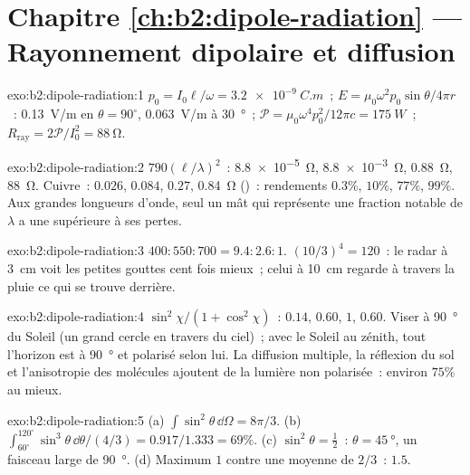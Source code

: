 \section*{Chapitre \ref{ch:b2:dipole-radiation} --- Rayonnement dipolaire et diffusion}

\begin{solution}{exo:b2:dipole-radiation:1}
$p_0 = I_0\ell/\omega = \qty{3.2e-9}{C.m}$~; $E = \mu_0\omega^2p_0\sin\theta/4\pi r$~: \qty{0.13}{V/m}
en $\theta = 90^\circ$, \qty{0.063}{V/m} à \qty{30}{\degree}~; $\mathcal P = \mu_0\omega^4p_0^2/12\pi c =
\qty{175}{W}$~; $R_{\text{ray}} = 2\mathcal P/I_0^2 = \qty{88}{\ohm}$.
\end{solution}

\begin{solution}{exo:b2:dipole-radiation:2}
$790(\ell/\lambda)^2$~: \qty{8.8e-5}{\ohm}, \qty{8.8e-3}{\ohm}, \qty{0.88}{\ohm}, \qty{88}{\ohm}. Cuivre~:
$0.026$, $0.084$, $0.27$, \qty{0.84}{\ohm} ()~: rendements $0.3\%$, $10\%$,
$77\%$, $99\%$. Aux grandes longueurs d'onde, seul un mât qui représente une fraction notable de
$\lambda$ a une  supérieure à ses pertes.
\end{solution}

\begin{solution}{exo:b2:dipole-radiation:3}
$400 : 550 : 700 = 9.4 : 2.6 : 1$. $(10/3)^4 = 120$~: le radar à \qty{3}{cm}
voit les petites gouttes cent fois mieux~; celui à \qty{10}{cm} regarde
à travers la pluie ce qui se trouve derrière.
\end{solution}

\begin{solution}{exo:b2:dipole-radiation:4}
$\sin^2\chi/(1 + \cos^2\chi)$~: $0.14$, $0.60$, $1$, $0.60$. Viser à \qty{90}{\degree} du
Soleil (un grand cercle en travers du ciel)~; avec le Soleil au zénith, tout
l'horizon est à \qty{90}{\degree} et polarisé selon lui. La diffusion multiple,
la réflexion du sol et l'anisotropie des molécules ajoutent de la lumière non
polarisée~: environ $75\%$ au mieux.
\end{solution}

\begin{solution}{exo:b2:dipole-radiation:5}
(a) $\int\sin^2\theta\,\dd\Omega = 8\pi/3$. (b) $\int_{60^\circ}^{120^\circ}\sin^3\theta\,\dd\theta/
(4/3) = 0.917/1.333 = 69\%$. (c) $\sin^2\theta = \tfrac12$~: $\theta = \qty{45}{\degree}$, un
faisceau large de \qty{90}{\degree}. (d) Maximum $1$ contre une moyenne de $2/3$~: $1.5$.
\end{solution}

